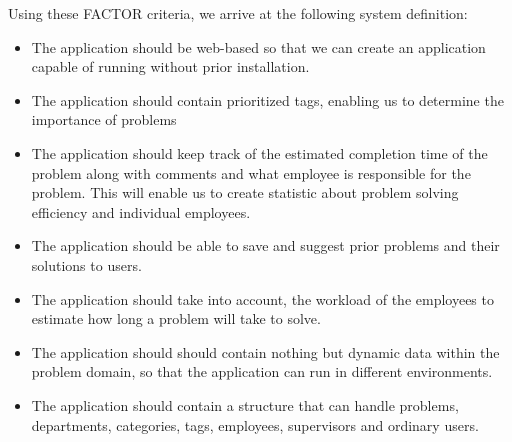 Using these FACTOR criteria, we arrive at the following system definition:
\begin{itemize}
\item The application should be web-based so that we can create an application capable of running without prior installation.
\item The application should contain prioritized tags, enabling us to determine the importance of problems
\item The application should keep track of the estimated completion time of the problem along with comments and what employee is responsible for the problem. This will enable us to create statistic about problem solving efficiency and individual employees.
\item The application should be able to save and suggest prior problems and their solutions to users.
\item The application should take into account, the workload of the employees to estimate how long a problem will take to solve.
\item The application should should contain nothing but dynamic data within the problem domain, so that the application can run in different environments.
\item The application should contain a structure that can handle problems, departments, categories, tags, employees, supervisors and ordinary users.
\end{itemize}

